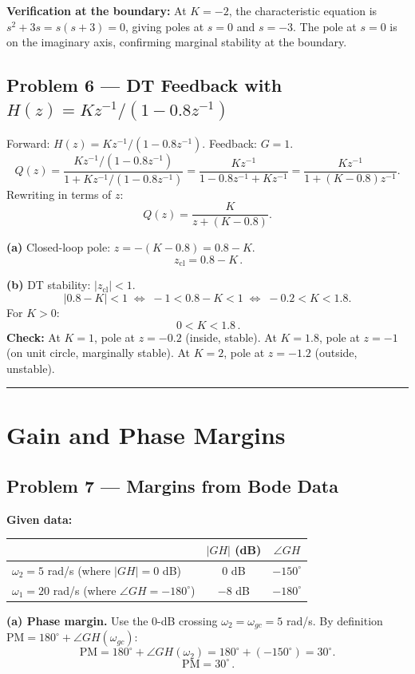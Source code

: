 \documentclass[11pt]{article}
\newcommand{\boxedeq}[1]{\boxed{\,#1\,}}
\begin{document}
\textbf{Verification at the boundary:} At $K=-2$, the characteristic equation is
$s^2+3s = s(s+3)=0$, giving poles at $s=0$ and $s=-3$.
The pole at $s=0$ is on the imaginary axis, confirming marginal stability at the boundary.

\subsection*{Problem 6 --- DT Feedback with $H(z)=Kz^{-1}/(1-0.8z^{-1})$}

Forward: $H(z)=Kz^{-1}/(1-0.8z^{-1})$. Feedback: $G=1$.
\[
Q(z) = \frac{Kz^{-1}/(1-0.8z^{-1})}{1+Kz^{-1}/(1-0.8z^{-1})}
     = \frac{Kz^{-1}}{1-0.8z^{-1}+Kz^{-1}}
     = \frac{Kz^{-1}}{1+(K-0.8)z^{-1}}.
\]
Rewriting in terms of $z$:
\[
Q(z) = \frac{K}{z+(K-0.8)}.
\]

\textbf{(a)} Closed-loop pole: $z = -(K-0.8) = 0.8-K$.
\[
\boxedeq{z_{\text{cl}} = 0.8-K}.
\]

\textbf{(b)} DT stability: $|z_{\text{cl}}|<1$.
\[
|0.8-K|<1 \;\Longleftrightarrow\; -1<0.8-K<1 \;\Longleftrightarrow\; -0.2<K<1.8.
\]
For $K>0$:
\[
\boxedeq{0<K<1.8}.
\]
\textbf{Check:} At $K=1$, pole at $z=-0.2$ (inside, stable). At $K=1.8$, pole at $z=-1$
(on unit circle, marginally stable). At $K=2$, pole at $z=-1.2$ (outside, unstable).

\bigskip\hrule\bigskip

\section*{Gain and Phase Margins}

\subsection*{Problem 7 --- Margins from Bode Data}

\textbf{Given data:}
\begin{center}
\begin{tabular}{lcc}
\toprule
 & $|GH|$ (dB) & $\angle GH$ \\
\midrule
$\omega_2=5$ rad/s (where $|GH|=0$ dB) & $0$ dB & $-150^\circ$ \\
$\omega_1=20$ rad/s (where $\angle GH=-180^\circ$) & $-8$ dB & $-180^\circ$ \\
\bottomrule
\end{tabular}
\end{center}

\textbf{(a) Phase margin.} Use the 0-dB crossing $\omega_2 = \omega_{gc} = 5$ rad/s.
By definition $\text{PM}=180^\circ+\angle GH(\omega_{gc})$:
\[
\text{PM} = 180^\circ + \angle GH(\omega_2) = 180^\circ + (-150^\circ) = 30^\circ.
\]
\[
\boxedeq{\text{PM} = 30^\circ}.
\]
\end{document}
